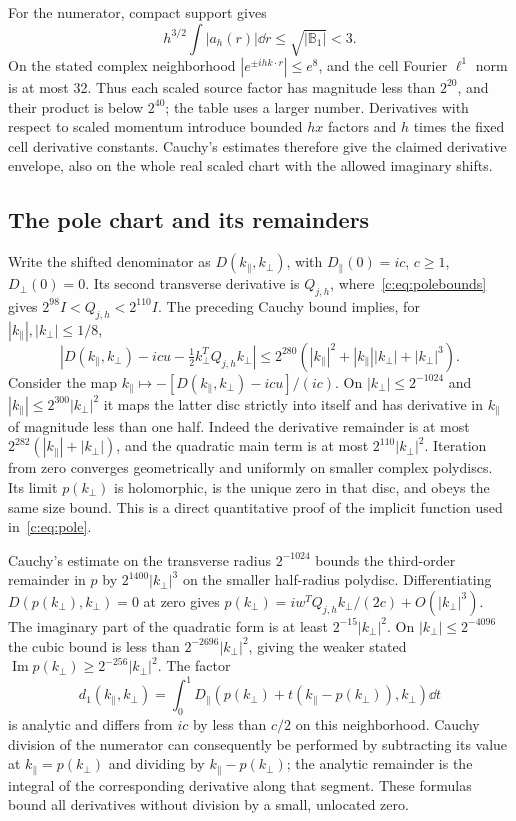 For the numerator, compact support gives
\[
 h^{3/2}\int|a_h(r)|\dd r\le\sqrt{|\mathbb B_1|}<3.
\]
On the stated complex neighborhood $|e^{\pm ihk\cdot r}|\le e^8$,
and the cell Fourier $\ell^1$ norm is at most 32. Thus each scaled
source factor has magnitude less than $2^{20}$, and their product
is below $2^{40}$; the table uses a larger number. Derivatives with
respect to scaled momentum introduce bounded $hx$ factors and
$h$ times the fixed cell derivative constants. Cauchy's estimates
therefore give the claimed derivative envelope, also on the whole
real scaled chart with the allowed imaginary shifts.

\subsection{The pole chart and its remainders}
Write the shifted denominator as $D(k_\parallel,k_\perp)$, with
$D_\parallel(0)=ic$, $c\ge1$, $D_\perp(0)=0$. Its second transverse derivative
is $Q_{j,h}$, where~\eqref{c:eq:polebounds} gives
$2^{98}I<Q_{j,h}<2^{110}I$. The preceding Cauchy bound implies, for
$|k_\parallel|,|k_\perp|\le1/8$,
\[
 |D(k_\parallel,k_\perp)-icu-\tfrac12k_\perp^TQ_{j,h}k_\perp|
 \le2^{280}(|k_\parallel|^2+|k_\parallel||k_\perp|+|k_\perp|^3).
\]
Consider the map
$k_\parallel\mapsto-[D(k_\parallel,k_\perp)-icu]/(ic)$. On
$|k_\perp|\le2^{-1024}$ and $|k_\parallel|\le2^{300}|k_\perp|^2$ it maps the latter
disc strictly into itself and has derivative in $k_\parallel$ of magnitude
less than one half. Indeed the derivative remainder is at most
$2^{282}(|k_\parallel|+|k_\perp|)$, and the quadratic main term is at most
$2^{110}|k_\perp|^2$. Iteration from zero converges geometrically and
uniformly on smaller complex polydiscs. Its limit $p(k_\perp)$ is
holomorphic, is the unique zero in that disc, and obeys the same
size bound. This is a direct quantitative proof of the implicit
function used in~\eqref{c:eq:pole}.

Cauchy's estimate on the transverse radius $2^{-1024}$ bounds the
third-order remainder in $p$ by $2^{1400}|k_\perp|^3$ on the smaller
half-radius polydisc. Differentiating $D(p(k_\perp),k_\perp)=0$ at zero gives
$p(k_\perp)=iw^TQ_{j,h}k_\perp/(2c)+O(|k_\perp|^3)$. The imaginary part of the quadratic
form is at least $2^{-15}|k_\perp|^2$. On $|k_\perp|\le2^{-4096}$ the cubic
bound is less than $2^{-2696}|k_\perp|^2$, giving the weaker stated
$\operatorname{Im}p(k_\perp)\ge2^{-256}|k_\perp|^2$.
The factor
\[
 d_1(k_\parallel,k_\perp)=\int_0^1D_\parallel(p(k_\perp)+t(k_\parallel-p(k_\perp)),k_\perp)\dd t
\]
is analytic and differs from $ic$ by less than $c/2$ on this
neighborhood. Cauchy division of the numerator can consequently
be performed by subtracting its value at $k_\parallel=p(k_\perp)$ and dividing
by $k_\parallel-p(k_\perp)$; the analytic remainder is the integral of the
corresponding derivative along that segment. These formulas bound
all derivatives without division by a small, unlocated zero.


